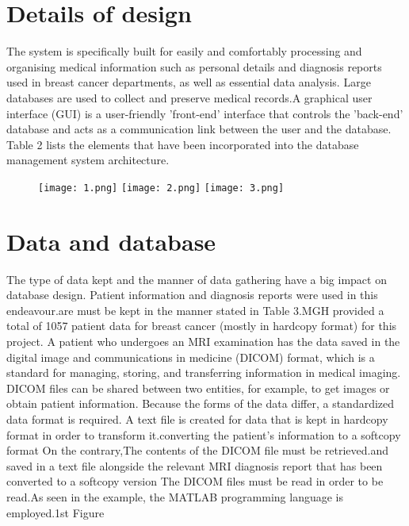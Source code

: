 \documentclass[10pt,a4paper,twoside]{article}
\begin{document}
\section{ Details of design}

The system is specifically built for easily and comfortably processing and organising medical information such as personal details and diagnosis reports used in breast cancer departments, as well as essential data analysis. Large databases are used to collect and preserve medical records.A graphical user interface (GUI) is a user-friendly 'front-end' interface that controls the 'back-end' database and acts as a communication link between the user and the database.
Table 2 lists the elements that have been incorporated into the database management system architecture.


\begin{figure}
  \texttt{[image: 1.png]} \texttt{[image: 2.png]}
  \texttt{[image: 3.png]}
  
  
  
\end{figure}



\section{Data and database}

The type of data kept and the manner of data gathering have a big impact on database design. Patient information and diagnosis reports were used in this endeavour.are must be kept in the manner stated in Table 3.MGH provided a total of 1057 patient data for breast cancer (mostly in hardcopy format) for this project. A patient who undergoes an MRI examination has the data saved in the digital image and communications in medicine (DICOM) format, which is a standard for managing, storing, and transferring information in medical imaging. DICOM files can be shared between two entities, for example, to get images or obtain patient information.
\vspace{0.3cm}
Because the forms of the data differ, a standardized data format is required. A text file is created for data that is kept in hardcopy format in order to transform it.converting the patient's information to a softcopy format On the contrary,The contents of the DICOM file must be retrieved.and saved in a text file alongside the relevant MRI diagnosis report that has been converted to a softcopy version The DICOM files must be read in order to be read.As seen in the example, the MATLAB programming language is employed.1st Figure
\end{document}
